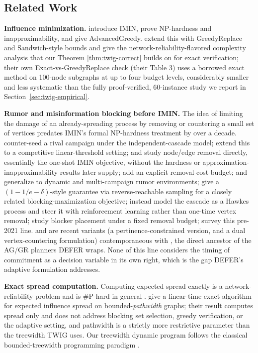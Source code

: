 \documentclass[ijoc,sglanonrev]{informs4}
\begin{document}
\subsection{Related Work}\label{sec:related}

\textbf{Influence minimization.} \citet{xie2023} introduce IMIN, prove
NP-hardness and inapproximability, and give AdvancedGreedy. \citet{xie2024}
extend this with GreedyReplace and Sandwich-style bounds and give the
network-reliability-flavored complexity analysis that our Theorem
\ref{thm:twig-correct} builds on for exact verification; their own
Exact-vs-GreedyReplace check (their Table 3) uses a borrowed exact method on
100-node subgraphs at up to four budget levels, considerably smaller and
less systematic than the fully proof-verified, 60-instance study we report
in Section~\ref{sec:twig-empirical}.

\textbf{Rumor and misinformation blocking before IMIN.} The idea of limiting
the damage of an already-spreading process by removing or countering a
small set of vertices predates IMIN's formal NP-hardness treatment by over
a decade. \citet{budak2011} counter-seed a rival campaign under the
independent-cascade model; \citet{he2012} extend this to a competitive
linear-threshold setting; \citet{nguyen2012} and \citet{wang2013blocking}
study node/edge removal directly, essentially the one-shot IMIN objective,
without the hardness or approximation-inapproximability results
\citet{xie2023} later supply; \citet{fan2013} add an explicit removal-cost
budget; \citet{wang2016drimux} and \citet{tong2018} generalize to dynamic
and multi-campaign rumor environments; \citet{tong2017} give a
$(1-1/e-\delta)$-style guarantee via reverse-reachable sampling for a
closely related blocking-maximization objective; \citet{farajtabar2017}
instead model the cascade as a Hawkes process and steer it with
reinforcement learning rather than one-time vertex removal; \citet{yan2020}
study blocker placement under a fixed removal budget; \citeauthor{zareie2021}
survey this pre-2021 line. \citet{xiang2024} and \citet{xie2024pvldb} are
recent variants (a pertinence-constrained version, and a dual
vertex-countering formulation) contemporaneous with \citet{xie2024}, the
direct ancestor of the AG/GR planners DEFER wraps. None of this line
considers the timing of commitment as a decision variable in its own
right, which is the gap DEFER's adaptive formulation addresses.

\textbf{Exact spread computation.} Computing expected spread exactly is a
network-reliability problem and is \#P-hard in general
\citep{valiant1979,provan1983}. \citet{nakamura2026} give a linear-time
exact algorithm for expected influence spread on bounded-\emph{pathwidth}
graphs; their result computes spread only and does not address blocking set
selection, greedy verification, or the adaptive setting, and pathwidth is a
strictly more restrictive parameter than the treewidth TWIG uses. Our
treewidth dynamic program follows the classical bounded-treewidth
programming paradigm \citep{bodlaender1988,cygan2015}.
\end{document}
